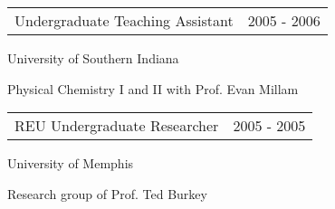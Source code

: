 \documentclass[10pt]{article}
\newenvironment{outerlist}[1][\enskip\textbullet]%
        {\begin{itemize}[#1]}{\end{itemize}%
         \vspace{-.6\baselineskip}}
\newenvironment{innerlist}[1][\enskip\textbullet]%
        {\begin{compactitem}[#1]}{\end{compactitem}}
\newcommand{\blankline}{\quad\pagebreak[2]}
\begin{document}
\begin{tabular}{p{240pt} l}
Undergraduate Teaching Assistant  & 2005 - 2006
\end{tabular}
\begin{innerlist}
\item[\hspace*{20pt}] University of Southern Indiana
\item[\hspace*{20pt}] Physical Chemistry I and II with Prof. Evan Millam\\
\end{innerlist}
%
\vspace{-8pt}

\begin{tabular}{p{240pt} l}
REU Undergraduate Researcher  & 2005 - 2005
\end{tabular}
\begin{innerlist}
\item[\hspace*{20pt}] University of Memphis
\item[\hspace*{20pt}] Research group of Prof. Ted Burkey\\
\end{innerlist}


\blankline
\end{document}
